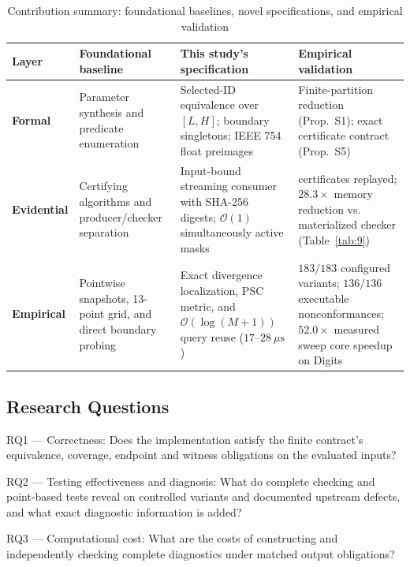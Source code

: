 \documentclass[11pt,a4paper]{article}
\begin{document}
\begin{table}[!htbp]
\caption{Contribution summary: foundational baselines, novel specifications, and empirical validation}\label{tab:1}
\centering
\footnotesize
\setlength{\tabcolsep}{3.5pt}
\renewcommand{\arraystretch}{1.2}
\begin{tabularx}{\textwidth}{@{} >{\raggedright\arraybackslash}p{2.2cm} >{\raggedright\arraybackslash}X >{\raggedright\arraybackslash}X >{\raggedright\arraybackslash}X @{}}
\toprule
\textbf{Layer} & \textbf{Foundational baseline} & \textbf{This study's specification} & \textbf{Empirical validation} \\
\midrule
\textbf{Formal} & Parameter synthesis and predicate enumeration \cite{storm2026parametric,mathsat_api} & Selected-ID equivalence over $[L, H]$; boundary singletons; IEEE 754 float preimages & Finite-partition reduction (Prop.~S1); exact certificate contract (Prop.~S5) \\
\midrule
\textbf{Evidential} & Certifying algorithms and producer/checker separation \cite{alkassar2013framework,mcconnell2011certifying} & Input-bound streaming consumer with SHA-256 digests; $\mathcal{O}(1)$ simultaneously active masks & 428 certificates replayed; $28.3\times$ memory reduction vs. materialized checker (Table~\ref{tab:9}) \\
\midrule
\textbf{Empirical} & Pointwise snapshots, 13-point grid, and direct boundary probing & Exact divergence localization, PSC metric, and $\mathcal{O}(\log(M+1))$ query reuse ($17\text{--}28\ \mu\text{s}$) & $183/183$ configured variants; $136/136$ executable nonconformances; $52.0\times$ measured sweep core speedup on Digits \\
\bottomrule
\end{tabularx}
\end{table}
\FloatBarrier


\subsection{Research Questions}

RQ1 --- Correctness: Does the implementation satisfy the finite contract's equivalence, coverage, endpoint and witness obligations on the evaluated inputs?

RQ2 --- Testing effectiveness and diagnosis: What do complete checking and point-based tests reveal on controlled variants and documented upstream defects, and what exact diagnostic information is added?

RQ3 --- Computational cost: What are the costs of constructing and independently checking complete diagnostics under matched output obligations?
\end{document}
